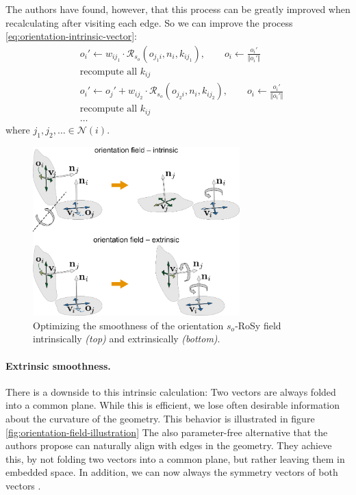 \documentclass{ACGSeminar}
\begin{document}
The authors have found, however, that this process can be greatly improved when recalculating after visiting each edge. So we can improve the process \eqref{eq:orientation-intrinsic-vector}:
\begin{equation}
\begin{split}
	& o_i' \leftarrow w_{ij_1} \cdot \mathcal{R}_{s_o}(o_{j_1i}, n_i, k_{ij_1}), \qquad o_i \leftarrow \frac{o_i'}{\Vert o_i' \Vert}\\
	& \textrm{recompute all } k_{ij}\\
	& o_i' \leftarrow o_j' + w_{ij_2} \cdot \mathcal{R}_{s_o}(o_{j_2i}, n_i, k_{ij_2}), \qquad o_i \leftarrow \frac{o_i'}{\Vert o_i' \Vert}\\
	& \textrm{recompute all } k_{ij}\\
	& \dots
\end{split}
\end{equation}
where $j_1, j_2, \dots \in \mathcal{N}(i)$.

\begin{figure}[htb!]
	\begin{centering}
		\includegraphics[width=8cm]{img/orientation-field-intrinsic-extrinsic.png}\par
	\end{centering}
	\caption{Optimizing the smoothness of the orientation $s_o$-RoSy field intrinsically \textit{(top)} and extrinsically \textit{(bottom)}. \cite{jakob2015instant}}
	\label{fig:orientation-field-intrinsic-extrinsic}
\end{figure}

\paragraph{Extrinsic smoothness.}
There is a downside to this intrinsic calculation: Two vectors are always folded into a common plane. While this is efficient, we lose often desirable information about the curvature of the geometry. This behavior is illustrated in figure \ref{fig:orientation-field-illustration} The also parameter-free alternative that the authors propose can naturally align with edges in the geometry. They achieve this, by not folding two vectors into a common plane, but rather leaving them in embedded space. In addition, we can now always the symmetry vectors of both vectors \cite{jakob2015instant}.\bigskip
\end{document}
